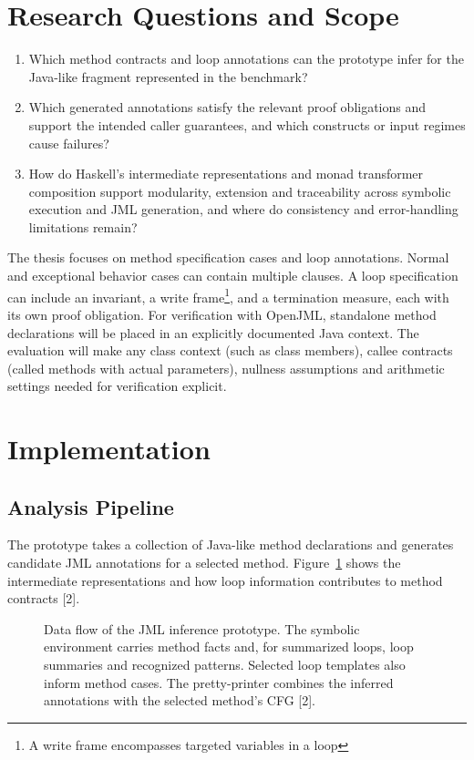 \documentclass[11pt,a4paper]{article}
\begin{document}
\section{Research Questions and Scope}
\begin{enumerate}
\item Which method contracts and loop annotations can the prototype infer for the Java-like fragment represented in the benchmark?
\item Which generated annotations satisfy the relevant proof obligations and support the intended caller guarantees, and which constructs or input regimes cause failures?
\item How do Haskell's intermediate representations and monad transformer composition support modularity, extension and traceability across symbolic execution and JML generation, and where do consistency and error-handling limitations remain?
\end{enumerate}
The thesis focuses on method specification cases and loop annotations. Normal and exceptional behavior cases can contain multiple clauses. A loop specification can include an invariant, a write frame\footnote{A write frame encompasses targeted variables in a loop}, and a termination measure, each with its own proof obligation. For verification with OpenJML, standalone method declarations will be placed in an explicitly documented Java context. The evaluation will make any class context (such as class members), callee contracts (called methods with actual parameters), nullness assumptions and arithmetic settings needed for verification explicit.

\section{Implementation}
\subsection{Analysis Pipeline}
The prototype takes a collection of Java-like method declarations and generates candidate JML annotations for a selected method. Figure~\ref{fig:pipeline} shows the intermediate representations and how loop information contributes to method contracts [2].

\begin{figure}[!htbp]
  \centering
  
  \caption{Data flow of the JML inference prototype. The symbolic environment carries method facts and, for summarized loops, loop summaries and recognized patterns. Selected loop templates also inform method cases. The pretty-printer combines the inferred annotations with the selected method's CFG [2].}
  \label{fig:pipeline}
\end{figure}
\end{document}
